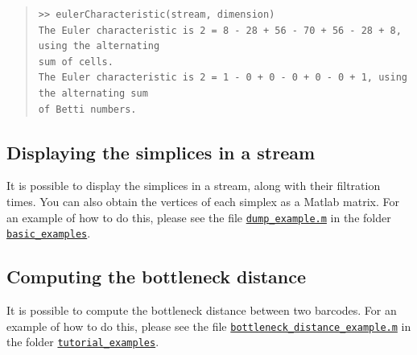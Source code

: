 \documentclass[amscd, amssymb, verbatim]{amsart}[12pt]
\theoremstyle{remark}
\theoremstyle{remark}
\theoremstyle{remark}
\begin{document}
\begin{quote} \begin{verbatim}
>> eulerCharacteristic(stream, dimension)
The Euler characteristic is 2 = 8 - 28 + 56 - 70 + 56 - 28 + 8, using the alternating 
sum of cells.
The Euler characteristic is 2 = 1 - 0 + 0 - 0 + 0 - 0 + 1, using the alternating sum 
of Betti numbers.
\end{verbatim} \end{quote}


\subsection{Displaying the simplices in a stream}

It is possible to display the simplices in a stream, along with their filtration times. You can also obtain the vertices of each simplex as a Matlab matrix. For an example of how to do this, please see the file \href{https://github.com/appliedtopology/javaplex/blob/master/src/matlab/for_distribution/basic_examples/dump_example.m}{\texttt{dump\_example.m}} in the folder \href{https://github.com/appliedtopology/javaplex/tree/master/src/matlab/for_distribution/basic_examples}{\texttt{basic\_examples}}.


\subsection{Computing the bottleneck distance}

It is possible to compute the bottleneck distance between two barcodes. For an example of how to do this, please see the file \href{https://github.com/appliedtopology/javaplex/tree/master/src/matlab/for_distribution/tutorial_examples/bottleneck_distance_example.m}{\texttt{bottleneck\_distance\_example.m}} in the folder \href{https://github.com/appliedtopology/javaplex/tree/master/src/matlab/for_distribution/tutorial_examples}{\texttt{tutorial\_examples}}.



\end{document}
